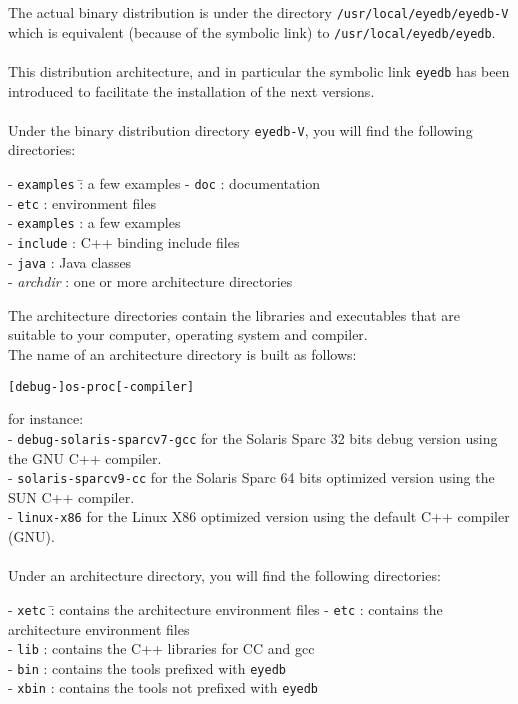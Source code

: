 The actual binary distribution is under the directory
\texttt{/usr/local/eyedb/eyedb-V\eyedbversion} which is equivalent (because of the
symbolic link) to \texttt{/usr/local/eyedb/eyedb}.
\\
\\
This distribution architecture, and in particular the symbolic link
\texttt{eyedb} has been introduced to facilitate the installation of the
next \eyedb versions.
\\
\\
Under the binary distribution directory \texttt{eyedb-V\eyedbversion}, you will find
the following directories:
\begin{tabbing}
- \texttt{examples} \= : a few examples \kill
- \texttt{doc} \> : documentation \\
- \texttt{etc} \> : environment files \\
- \texttt{examples} \> : a few examples \\
- \texttt{include} \> : C++ binding include files \\
- \texttt{java} \> : Java classes \\
- \emph{archdir} \> : one or more architecture directories
\end{tabbing}
The architecture directories contain the libraries and executables that
are suitable to your computer, operating system and compiler.
\\
The name of an architecture directory is built as follows:
\begin{verbatim}
[debug-]os-proc[-compiler]
\end{verbatim}
for instance:\\
- \texttt{debug-solaris-sparcv7-gcc} for the Solaris Sparc 32 bits debug version
using the GNU C++ compiler.\\
- \texttt{solaris-sparcv9-cc} for the Solaris Sparc 64 bits optimized version
using the SUN C++ compiler.\\
- \texttt{linux-x86} for the Linux X86 optimized version
using the default C++ compiler (GNU).\\
\\
Under an architecture directory, you will find
the following directories:
\begin{tabbing}
- \texttt{xetc} \= : contains the architecture environment files \kill
- \texttt{etc} \> : contains the architecture environment files \\
- \texttt{lib} \> : contains the C++ libraries for CC and gcc \\
- \texttt{bin} \> : contains the \eyedb tools prefixed with \texttt{eyedb} \\
- \texttt{xbin} \> : contains the \eyedb tools not prefixed with \texttt{eyedb} \\
\end{tabbing}
